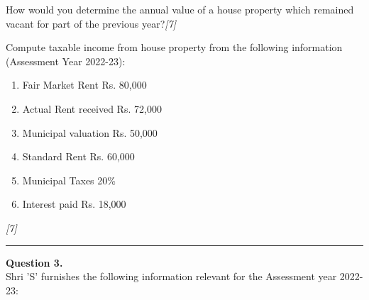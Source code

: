 \documentclass[11pt,a4paper]{article}
\newcommand{\pts}[1]{\hfill   \textit{[#1]}}
\begin{document}
\begin{parts}
  \item How would you determine the annual value of a house property which remained vacant for part of the previous year?\pts{7}
  \item Compute taxable income from house property from the following information (Assessment Year 2022-23):
  
\begin{enumerate}[label=(\roman*),leftmargin=*]
    \item Fair Market Rent \hfill Rs. 80,000
    \item Actual Rent received \hfill Rs. 72,000
    \item Municipal valuation \hfill Rs. 50,000
    \item Standard Rent \hfill Rs. 60,000
    \item Municipal Taxes \hfill 20\%
    \item Interest paid \hfill Rs. 18,000
  \end{enumerate}\pts{7}
\end{parts}

\medskip\rule{\linewidth}{0.2pt}




\noindent   \textbf{Question 3.} \\
Shri 'S' furnishes the following information relevant for the Assessment year 2022-23:
\end{document}
